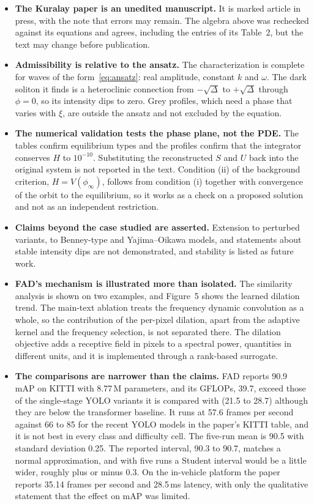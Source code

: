 \documentclass[11pt]{article}
\theoremstyle{definition}
\theoremstyle{remark}
\begin{document}
\begin{itemize}[leftmargin=1.6em,itemsep=2pt]
  \item \textbf{The Kuralay paper is an unedited manuscript.} It is marked article in press, with the note that errors may remain. The algebra above was rechecked against its equations and agrees, including the entries of its Table~2, but the text may change before publication.
  \item \textbf{Admissibility is relative to the ansatz.} The characterization is complete for waves of the form~\eqref{eq:ansatz}: real amplitude, constant $k$ and $\omega$. The dark soliton it finds is a heteroclinic connection from $-\sqrt\Delta$ to $+\sqrt\Delta$ through $\phi=0$, so its intensity dips to zero. Grey profiles, which need a phase that varies with $\xi$, are outside the ansatz and not excluded by the equation.
  \item \textbf{The numerical validation tests the phase plane, not the PDE.} The tables confirm equilibrium types and the profiles confirm that the integrator conserves $H$ to $10^{-10}$. Substituting the reconstructed $S$ and $U$ back into the original system is not reported in the text. Condition (ii) of the background criterion, $H=V(\phi_\infty)$, follows from condition (i) together with convergence of the orbit to the equilibrium, so it works as a check on a proposed solution and not as an independent restriction.
  \item \textbf{Claims beyond the case studied are asserted.} Extension to perturbed variants, to Benney-type and Yajima--Oikawa models, and statements about stable intensity dips are not demonstrated, and stability is listed as future work.
  \item \textbf{FAD's mechanism is illustrated more than isolated.} The similarity analysis is shown on two examples, and Figure~5 shows the learned dilation trend. The main-text ablation treats the frequency dynamic convolution as a whole, so the contribution of the per-pixel dilation, apart from the adaptive kernel and the frequency selection, is not separated there. The dilation objective adds a receptive field in pixels to a spectral power, quantities in different units, and it is implemented through a rank-based surrogate.
  \item \textbf{The comparisons are narrower than the claims.} FAD reports 90.9 mAP on KITTI with 8.77\,M parameters, and its GFLOPs, 39.7, exceed those of the single-stage YOLO variants it is compared with (21.5 to 28.7) although they are below the transformer baseline. It runs at 57.6 frames per second against 66 to 85 for the recent YOLO models in the paper's KITTI table, and it is not best in every class and difficulty cell. The five-run mean is 90.5 with standard deviation 0.25. The reported interval, 90.3 to 90.7, matches a normal approximation, and with five runs a Student interval would be a little wider, roughly plus or minus 0.3. On the in-vehicle platform the paper reports 35.14 frames per second and 28.5\,ms latency, with only the qualitative statement that the effect on mAP was limited.

\end{itemize}
\end{document}
